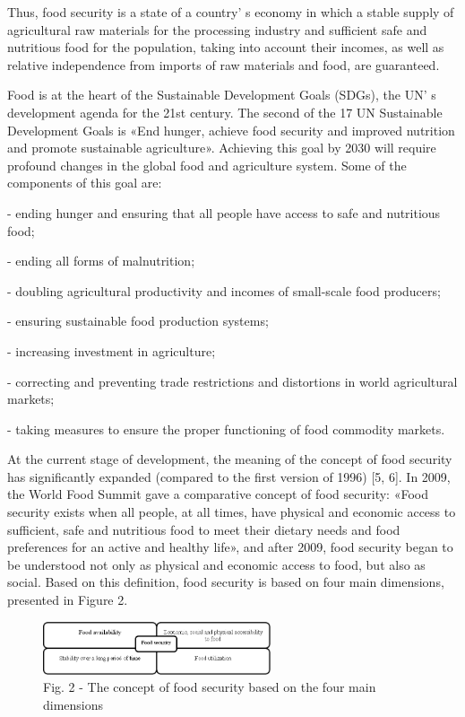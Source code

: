 \begin{multicols}{2}
Thus, food security is a state of a country' s economy in
which a stable supply of agricultural raw materials for the processing
industry and sufficient safe and nutritious food for the population,
taking into account their incomes, as well as relative independence from
imports of raw materials and food, are guaranteed.

Food is at the heart of the Sustainable Development Goals (SDGs), the
UN' s development agenda for the 21st century. The second
of the 17 UN Sustainable Development Goals is «End hunger, achieve food
security and improved nutrition and promote sustainable agriculture».
Achieving this goal by 2030 will require profound changes in the global
food and agriculture system. Some of the components of this goal are:

- ending hunger and ensuring that all people have access to safe and
nutritious food;

- ending all forms of malnutrition;

- doubling agricultural productivity and incomes of small-scale food
producers;

- ensuring sustainable food production systems;

- increasing investment in agriculture;

- correcting and preventing trade restrictions and distortions in world
agricultural markets;

- taking measures to ensure the proper functioning of food commodity
markets.

At the current stage of development, the meaning of the concept of food
security has significantly expanded (compared to the first version of
1996) {[}5, 6{]}. In 2009, the World Food Summit gave a comparative
concept of food security: «Food security exists when all people, at all
times, have physical and economic access to sufficient, safe and
nutritious food to meet their dietary needs and food preferences for an
active and healthy life», and after 2009, food security began to be
understood not only as physical and economic access to food, but also as
social. Based on this definition, food security is based on four main
dimensions, presented in Figure 2.
\end{multicols}

\begin{figure}[H]
	\centering
	\includegraphics[width=0.6\textwidth]{media/ekon3/image2}
	\caption*{Fig. 2 - The concept of food security based on the four main dimensions}
\end{figure}

